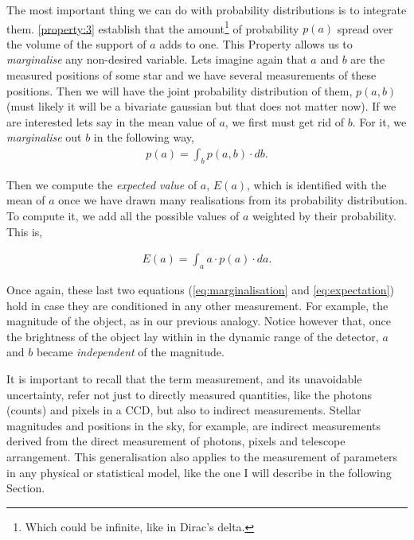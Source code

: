 The most important thing we can do with probability distributions is to integrate them. \ref{property:3} establish that the amount\footnote{Which could be infinite, like in Dirac's delta.} of probability $p(a)$ spread over the volume of the support of $a$ adds to one. This Property allows us to \emph{marginalise} any non-desired variable. Lets imagine again that $a$ and $b$ are the measured positions of some star and we have several measurements of these positions. Then we will have the joint probability distribution of them, $p(a,b)$ (must likely it will be a bivariate gaussian but that does not matter now). If we are interested lets say in the mean value of $a$, we first must get rid of $b$. For it, we \emph{marginalise} out $b$ in the following way,
\begin{align}
\label{eq:marginalisation}
p(a)=\int_b p(a,b)\cdot db.
\end{align}

Then we compute the \emph{expected value} of $a$, $E(a)$, which is identified with the mean of $a$ once we have drawn many realisations from its probability distribution. To compute it, we add all the possible values of $a$ weighted by their probability. This is,

\begin{align}
\label{eq:expectation}
E(a)=\int_a a\cdot p(a)\cdot da.
\end{align}

Once again, these last two equations (\ref{eq:marginalisation} and \ref{eq:expectation}) hold in case they are conditioned in any other measurement. For example, the magnitude of the object, as in our previous analogy. Notice however that, once the brightness of the object lay within in the dynamic range of the detector, $a$ and $b$ became \emph{independent} of the magnitude.

It is important to recall that the term measurement, and its unavoidable uncertainty, refer not just to directly measured quantities, like the photons (counts) and pixels in a CCD, but also to indirect measurements. Stellar magnitudes and positions in the sky, for example, are indirect measurements derived from the direct measurement of photons, pixels and telescope arrangement. This generalisation also applies to the measurement of parameters in any physical or statistical model, like the one I will describe in the following Section.

